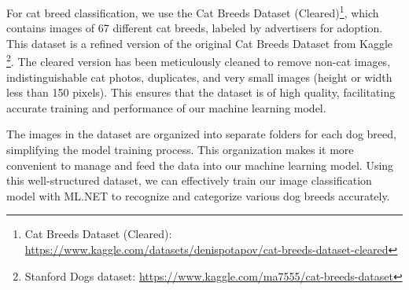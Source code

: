For cat breed classification, we use the Cat Breeds Dataset (Cleared)\footnote{Cat Breeds Dataset (Cleared): \url{https://www.kaggle.com/datasets/denispotapov/cat-breeds-dataset-cleared}}, which contains images of 67 different cat breeds, labeled by advertisers for
adoption. This dataset is a refined version of the original Cat Breeds Dataset from Kaggle \footnote{Stanford Dogs dataset: \url{https://www.kaggle.com/ma7555/cat-breeds-dataset}}.
The cleared version has been meticulously cleaned to remove non-cat images, indistinguishable cat photos, duplicates, and very small images
(height or width less than 150 pixels). This ensures that the dataset is of high quality, facilitating accurate training and performance of our
machine learning model.

The images in the dataset are organized into separate folders for each dog breed, simplifying the model training process. This organization
makes it more convenient to manage and feed the data into our machine learning model. Using this well-structured dataset, we can effectively
train our image classification model with ML.NET to recognize and categorize various dog breeds accurately.

